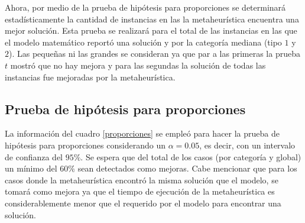 \documentclass[preprint,12pt, pdftex]{elsarticle}
\begin{document}
Ahora, por medio de la prueba de hipótesis para proporciones se determinará estadísticamente la cantidad de instancias en las la metaheurística encuentra una mejor solución. Esta prueba se realizará para el total de las instancias en las que el modelo matemático reportó una solución y por la categoría mediana (tipo $1$ y $2$). Las pequeñas ni las grandes se consideran ya que par a las primeras la prueba $t$ mostró que no hay mejora y para las segundas la solución de todas las instancias fue mejoradas por la metaheurística.

\subsection{\textbf{Prueba de hipótesis para proporciones}}

La información del cuadro \ref{proporciones} se empleó para hacer la prueba de hipótesis para proporciones considerando un $\alpha = 0.05$, es decir, con un intervalo de confianza del $95\%$. Se espera que del total de los casos (por categoría y global) un mínimo del $60\%$ sean detectados como mejoras. Cabe mencionar que para los casos donde la metaheurística encontró la misma solución que el modelo, se tomará como mejora ya que el tiempo de ejecución de la metaheurística es considerablemente menor que el requerido por el modelo para encontrar una solución.
\end{document}
